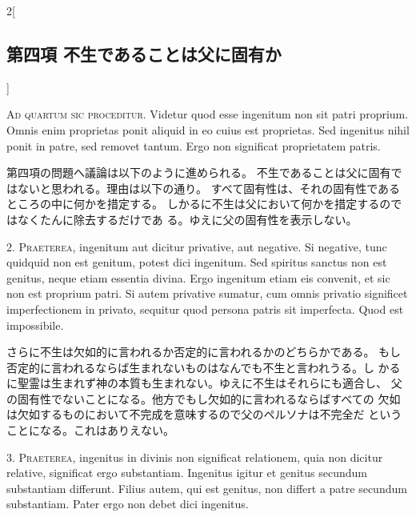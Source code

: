\documentclass[paper=a4paper,fontsize=10pt,jafontsize=9pt,titlepage]{jlreq}
\begin{document}
\begin{paracol}{2}[\subsection{第四項 不生であることは父に固有か}]

{\scshape Ad quartum sic proceditur}. Videtur quod esse ingenitum non sit patri
proprium. Omnis enim proprietas ponit aliquid in eo cuius est
proprietas. Sed ingenitus nihil ponit in patre, sed removet
tantum. Ergo non significat proprietatem patris.


\switchcolumn


第四項の問題へ議論は以下のように進められる。
不生であることは父に固有ではないと思われる。理由は以下の通り。
すべて固有性は、それの固有性であるところの中に何かを措定する。
しかるに不生は父において何かを措定するのではなくたんに除去するだけであ
 る。ゆえに父の固有性を表示しない。




2. {\scshape Praeterea}, ingenitum aut dicitur privative, aut negative. Si negative,
tunc quidquid non est genitum, potest dici ingenitum. Sed spiritus
sanctus non est genitus, neque etiam essentia divina. Ergo ingenitum
etiam eis convenit, et sic non est proprium patri. Si autem privative
sumatur, cum omnis privatio significet imperfectionem in privato,
sequitur quod persona patris sit imperfecta. Quod est impossibile.


\switchcolumn


さらに不生は欠如的に言われるか否定的に言われるかのどちらかである。
もし否定的に言われるならば生まれないものはなんでも不生と言われうる。し
 かるに聖霊は生まれず神の本質も生まれない。ゆえに不生はそれらにも適合し、
 父の固有性でないことになる。他方でもし欠如的に言われるならばすべての
 欠如は欠如するものにおいて不完成を意味するので父のペルソナは不完全だ
 ということになる。これはありえない。




3. {\scshape Praeterea}, ingenitus in divinis non significat relationem, quia non
dicitur relative, significat ergo substantiam. Ingenitus igitur et
genitus secundum substantiam differunt. Filius autem, qui est genitus,
non differt a patre secundum substantiam. Pater ergo non debet dici
ingenitus.



\end{paracol}
\end{document}
